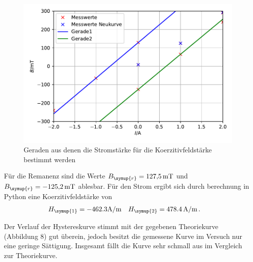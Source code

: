 \documentclass[
  bibliography=totoc,     %
  captions=tableheading,  %
  titlepage=firstiscover, %
]{scrartcl}
\begin{document}
  \FloatBarrier

  \begin{figure}
    \centering
    \includegraphics{koerzitiv.pdf}
    \caption{Geraden aus denen die Stromstärke für die Koerzitivfeldstärke bestimmt werden}
    \label{fig:koerzitiv}
  \end{figure}

  \FloatBarrier

  Für die Remanenz sind die Werte $B_{\symup{r}} = \SI{127,5}{\milli\tesla}$ und $B_{\symup{r}}=\SI{-125,2}{\milli\tesla}$
  ablesbar.
  Für den Strom ergibt sich durch berechnung in Python eine Koerzitivfeldstärke von 
  \begin{align}
    H_{\symup{1}}&=-462.3 \text{A/m} & H_{\symup{2}}&=478.4\, \text{A/m}\,.
  \end{align}

  Der Verlauf der Hystereskurve stimmt mit der gegebenen Theoriekurve (Abbildung 8) gut überein,
  jedoch besitzt die gemessene Kurve im Versuch nur eine geringe Sättigung. Insgesamt fällt 
  die Kurve sehr schmall aus im Vergleich zur Theoriekurve.
\end{document}
